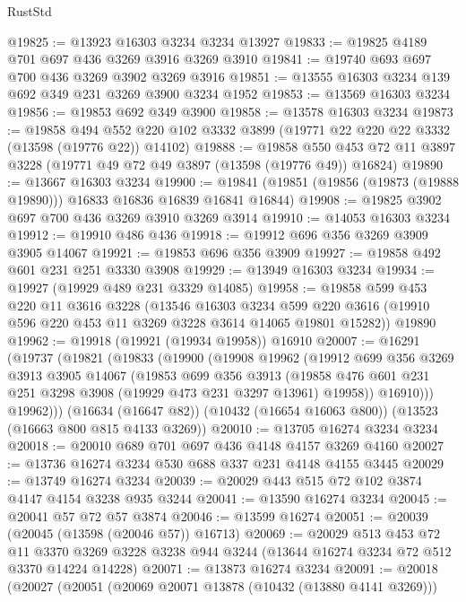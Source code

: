\begin{lexlean}{RustStd}
\begin{coremodule}
@19825 := @13923 @16303 @3234 @3234 @13927
@19833 := @19825 @4189 @701 @697 @436 @3269 @3916 @3269 @3910
@19841 := @19740 @693 @697 @700 @436 @3269 @3902 @3269 @3916
@19851 := @13555 @16303 @3234 @139 @692 @349 @231 @3269 @3900 @3234 @1952
@19853 := @13569 @16303 @3234
@19856 := @19853 @692 @349 @3900
@19858 := @13578 @16303 @3234
@19873 := @19858
    @494
    @552
    @220
    @102
    @3332
    @3899
    (@19771 @22 @220 @22 @3332 (@13598 (@19776 @22)) @14102)
@19888 := @19858
    @550
    @453
    @72
    @11
    @3897
    @3228
    (@19771 @49 @72 @49 @3897 (@13598 (@19776 @49)) @16824)
@19890 := @13667 @16303 @3234
@19900 := @19841 (@19851 (@19856 (@19873 (@19888 @19890))) @16833 @16836 @16839 @16841 @16844)
@19908 := @19825 @3902 @697 @700 @436 @3269 @3910 @3269 @3914
@19910 := @14053 @16303 @3234
@19912 := @19910 @486 @436
@19918 := @19912 @696 @356 @3269 @3909 @3905 @14067
@19921 := @19853 @696 @356 @3909
@19927 := @19858 @492 @601 @231 @251 @3330 @3908
@19929 := @13949 @16303 @3234
@19934 := @19927 (@19929 @489 @231 @3329 @14085)
@19958 := @19858
    @599
    @453
    @220
    @11
    @3616
    @3228
    (@13546
      @16303
      @3234
      @599
      @220
      @3616
      (@19910 @596 @220 @453 @11 @3269 @3228 @3614 @14065 @19801 @15282))
    @19890
@19962 := @19918 (@19921 (@19934 @19958)) @16910
@20007 := @16291
    (@19737
      (@19821
        (@19833
          (@19900
            (@19908
              @19962
              (@19912
                @699
                @356
                @3269
                @3913
                @3905
                @14067
                (@19853
                  @699
                  @356
                  @3913
                  (@19858 @476 @601 @231 @251 @3298 @3908 (@19929 @473 @231 @3297 @13961) @19958))
                @16910)))
          @19962)))
    (@16634 (@16647 @82))
    (@10432 (@16654 @16063 @800))
    (@13523 (@16663 @800 @815 @4133 @3269))
@20010 := @13705 @16274 @3234 @3234
@20018 := @20010 @689 @701 @697 @436 @4148 @4157 @3269 @4160
@20027 := @13736 @16274 @3234 @530 @688 @337 @231 @4148 @4155 @3445
@20029 := @13749 @16274 @3234
@20039 := @20029 @443 @515 @72 @102 @3874 @4147 @4154 @3238 @935 @3244
@20041 := @13590 @16274 @3234
@20045 := @20041 @57 @72 @57 @3874
@20046 := @13599 @16274
@20051 := @20039 (@20045 (@13598 (@20046 @57)) @16713)
@20069 := @20029
    @513
    @453
    @72
    @11
    @3370
    @3269
    @3228
    @3238
    @944
    @3244
    (@13644 @16274 @3234 @72 @512 @3370 @14224 @14228)
@20071 := @13873 @16274 @3234
@20091 := @20018
    (@20027
      (@20051
        (@20069 @20071 @13878 (@10432 (@13880 @4141 @3269)))

\end{coremodule}
\end{lexlean}

